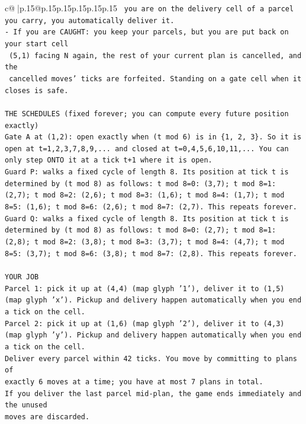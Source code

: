 \documentclass{article}
\begin{document}
{\begin{supertabular}{c@{$\;$}|p{.15\linewidth}@{}p{.15\linewidth}p{.15\linewidth}p{.15\linewidth}p{.15\linewidth}p{.15\linewidth}}
{{{\texttt{     you are on the delivery cell of a parcel you carry, you automatically deliver it.} \\
\texttt{{-} If you are CAUGHT: you keep your parcels, but you are put back on your start cell} \\
\texttt{  (5,1) facing N again, the rest of your current plan is cancelled, and the} \\
\texttt{  cancelled moves' ticks are forfeited. Standing on a gate cell when it closes is safe.} \\
\\ 
\texttt{THE SCHEDULES (fixed forever; you can compute every future position exactly)} \\
\texttt{Gate A at (1,2): open exactly when (t mod 6) is in \{1, 2, 3\}. So it is open at t=1,2,3,7,8,9,... and closed at t=0,4,5,6,10,11,... You can only step ONTO it at a tick t+1 where it is open.} \\
\texttt{Guard P: walks a fixed cycle of length 8. Its position at tick t is determined by (t mod 8) as follows: t mod 8=0: (3,7); t mod 8=1: (2,7); t mod 8=2: (2,6); t mod 8=3: (1,6); t mod 8=4: (1,7); t mod 8=5: (1,6); t mod 8=6: (2,6); t mod 8=7: (2,7). This repeats forever.} \\
\texttt{Guard Q: walks a fixed cycle of length 8. Its position at tick t is determined by (t mod 8) as follows: t mod 8=0: (2,7); t mod 8=1: (2,8); t mod 8=2: (3,8); t mod 8=3: (3,7); t mod 8=4: (4,7); t mod 8=5: (3,7); t mod 8=6: (3,8); t mod 8=7: (2,8). This repeats forever.} \\
\\ 
\texttt{YOUR JOB} \\
\texttt{Parcel 1: pick it up at (4,4) (map glyph '1'), deliver it to (1,5) (map glyph 'x'). Pickup and delivery happen automatically when you end a tick on the cell.} \\
\texttt{Parcel 2: pick it up at (1,6) (map glyph '2'), deliver it to (4,3) (map glyph 'y'). Pickup and delivery happen automatically when you end a tick on the cell.} \\
\texttt{Deliver every parcel within 42 ticks. You move by committing to plans of} \\
\texttt{exactly 6 moves at a time; you have at most 7 plans in total.} \\
\texttt{If you deliver the last parcel mid{-}plan, the game ends immediately and the unused} \\
\texttt{moves are discarded.} \\
\\ 
}}}
\end{supertabular}}
\end{document}
